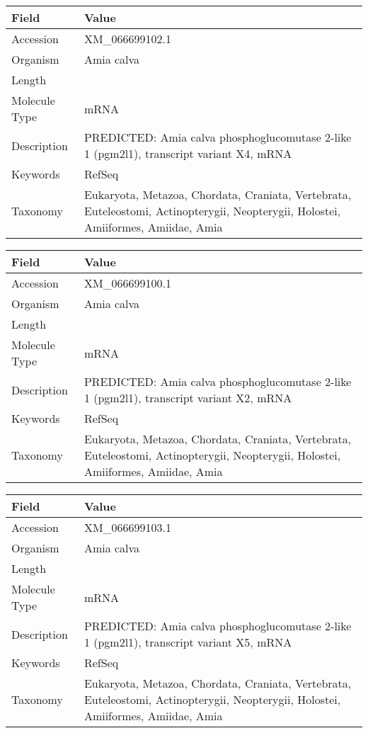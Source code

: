 \documentclass[10pt]{article}
\begin{document}
\vspace{1em}
{\footnotesize
\begin{longtable}{>{\raggedright\arraybackslash}p{4.5cm} >{\raggedright\arraybackslash}p{11.5cm}}
\textbf{Field} & \textbf{Value} \\
\hline
Accession & XM\_066699102.1 \\
Organism & Amia calva \\
Length & 6802 \\
Molecule Type & mRNA \\
Description & PREDICTED: Amia calva phosphoglucomutase 2-like 1 (pgm2l1), transcript variant X4, mRNA \\
Keywords & RefSeq \\
Taxonomy & Eukaryota, Metazoa, Chordata, Craniata, Vertebrata, Euteleostomi, Actinopterygii, Neopterygii, Holostei, Amiiformes, Amiidae, Amia \\
\end{longtable}
}

\vspace{1em}
{\footnotesize
\begin{longtable}{>{\raggedright\arraybackslash}p{4.5cm} >{\raggedright\arraybackslash}p{11.5cm}}
\textbf{Field} & \textbf{Value} \\
\hline
Accession & XM\_066699100.1 \\
Organism & Amia calva \\
Length & 6817 \\
Molecule Type & mRNA \\
Description & PREDICTED: Amia calva phosphoglucomutase 2-like 1 (pgm2l1), transcript variant X2, mRNA \\
Keywords & RefSeq \\
Taxonomy & Eukaryota, Metazoa, Chordata, Craniata, Vertebrata, Euteleostomi, Actinopterygii, Neopterygii, Holostei, Amiiformes, Amiidae, Amia \\
\end{longtable}
}

\vspace{1em}
{\footnotesize
\begin{longtable}{>{\raggedright\arraybackslash}p{4.5cm} >{\raggedright\arraybackslash}p{11.5cm}}
\textbf{Field} & \textbf{Value} \\
\hline
Accession & XM\_066699103.1 \\
Organism & Amia calva \\
Length & 7138 \\
Molecule Type & mRNA \\
Description & PREDICTED: Amia calva phosphoglucomutase 2-like 1 (pgm2l1), transcript variant X5, mRNA \\
Keywords & RefSeq \\
Taxonomy & Eukaryota, Metazoa, Chordata, Craniata, Vertebrata, Euteleostomi, Actinopterygii, Neopterygii, Holostei, Amiiformes, Amiidae, Amia \\
\end{longtable}
}
\end{document}
